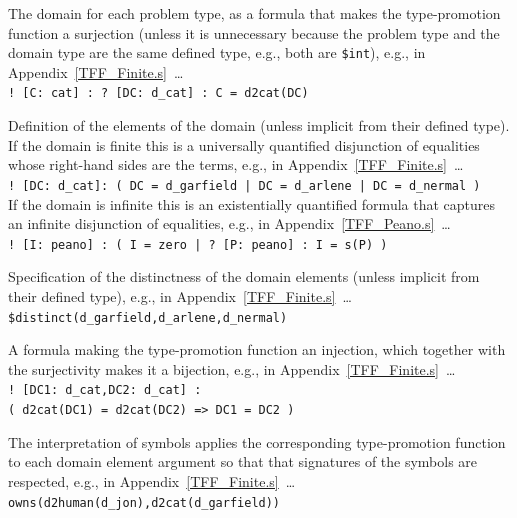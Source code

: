 \documentclass{easychair}
\newcommand{\smalltt}[1]{\small \texttt{#1}}
\newenvironment{packed_itemize}{
\vspace*{-0.3em}
\begin{itemize}
\setlength{\partopsep}{0pt}
\setlength{\itemsep}{1pt}
\setlength{\parskip}{0pt}
\setlength{\parsep}{0pt}
}{\end{itemize}}
\begin{document}
\begin{packed_itemize}
\item The domain for each problem type, as a formula that makes the type-promotion function a 
      surjection (unless it is unnecessary because the problem type and the domain type are the
      same defined type, e.g., both are {\tt \$int}), e.g., in Appendix~\ref{TFF_Finite.s}~\ldots\\
      \hspace*{0.5cm}\smalltt{! [C: cat] : ? [DC: d\_cat] : C = d2cat(DC)}
\item Definition of the elements of the domain (unless implicit from their defined type).
      If the domain is finite this is a universally quantified disjunction of equalities whose 
      right-hand sides are the terms, e.g., in Appendix~\ref{TFF_Finite.s}~\ldots\\
      \hspace*{0.5cm}\smalltt{! [DC: d\_cat]: ( DC = d\_garfield | DC = d\_arlene | DC = d\_nermal )}\\
      If the domain is infinite this is an existentially quantified formula that captures an 
      infinite disjunction of equalities, e.g., in Appendix~\ref{TFF_Peano.s}~\ldots\\
      \hspace*{0.5cm}\smalltt{! [I: peano] : ( I = zero | ? [P: peano] : I = s(P) )}
\item Specification of the distinctness of the domain elements (unless implicit from their
      defined type), e.g., in Appendix~\ref{TFF_Finite.s}~\ldots\\
      \hspace*{0.5cm}\smalltt{\$distinct(d\_garfield,d\_arlene,d\_nermal)}
\item A formula making the type-promotion function an injection,
      which together with the surjectivity makes it a bijection, e.g., in 
      Appendix~\ref{TFF_Finite.s}~\ldots\\
      \hspace*{0.5cm}\smalltt{! [DC1: d\_cat,DC2: d\_cat] :}\\
      \hspace*{1.0cm}\smalltt{( d2cat(DC1) = d2cat(DC2) => DC1 = DC2 )}
\end{packed_itemize}
\vspace*{-0.5em}
The interpretation of symbols applies the corresponding type-promotion function to each domain
element argument so that that signatures of the symbols are respected, e.g., in
Appendix~\ref{TFF_Finite.s}~\ldots\\
\hspace*{0.5cm}\smalltt{owns(d2human(d\_jon),d2cat(d\_garfield))}
\end{document}
